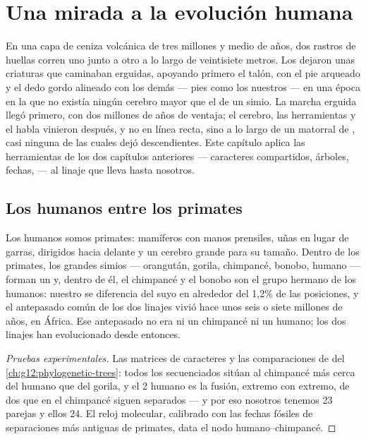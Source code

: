 \chapter{Una mirada a la evolución humana}\label{ch:g12:human-evolution}

En una capa de ceniza volcánica de tres millones y medio de años, dos
rastros de huellas corren uno junto a otro a lo largo de veintisiete
metros. Los dejaron unas criaturas que caminaban erguidas, apoyando
primero el talón, con el pie arqueado y el dedo gordo alineado con los
demás --- pies como los nuestros --- en una época en la que no existía
ningún cerebro mayor que el de un simio. La marcha erguida llegó
primero, con dos millones de años de ventaja; el cerebro, las
herramientas y el habla vinieron después, y no en línea recta, sino a
lo largo de un matorral de , casi ninguna de las cuales dejó
descendientes. Este capítulo aplica las herramientas de los dos
capítulos anteriores --- caracteres compartidos, árboles, fechas, 
--- al linaje que lleva hasta nosotros.

\section{Los humanos entre los primates}

\begin{proposition}\label{prop:g12:human-evolution:place}
Los humanos somos primates: mamíferos con manos prensiles, uñas en
lugar de garras,  dirigidos hacia delante y un cerebro grande para
su tamaño. Dentro de los primates, los grandes simios --- orangután,
gorila, chimpancé, bonobo, humano --- forman un  y, dentro de él,
el chimpancé y el bonobo son el grupo hermano de los humanos: nuestro
 se diferencia del suyo en alrededor del 1,2\% de las posiciones, y
el antepasado común de los dos linajes vivió hace unos seis o siete
millones de años, en África. Ese antepasado no era ni un chimpancé ni
un humano; los dos linajes han evolucionado desde entonces.
\end{proposition}
\begin{proof}[Pruebas experimentales]
Las matrices de caracteres y las comparaciones de  del
\cref{ch:g12:phylogenetic-trees}: todos los  secuenciados sitúan
al chimpancé más cerca del humano que del gorila, y el  2
humano es la fusión, extremo con extremo, de dos  que en el
chimpancé siguen separados --- y por eso nosotros tenemos 23 parejas y
ellos 24. El reloj molecular, calibrado con las fechas fósiles de
separaciones más antiguas de primates, data el nodo humano--chimpancé.
\end{proof}

